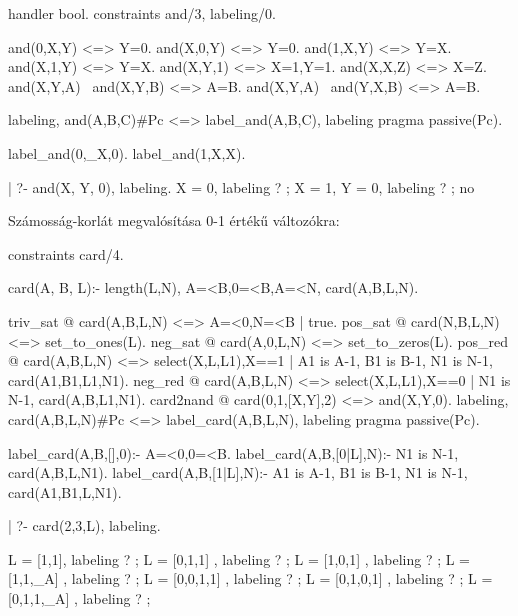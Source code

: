 \begin{prologcode}
handler bool.
constraints and/3, labeling/0. 

and(0,X,Y) <=> Y=0.                      
and(X,0,Y) <=> Y=0.                      
and(1,X,Y) <=> Y=X.                      
and(X,1,Y) <=> Y=X.                      
and(X,Y,1) <=> X=1,Y=1.                  
and(X,X,Z) <=> X=Z.                      
and(X,Y,A) \ and(X,Y,B) <=> A=B.         
and(X,Y,A) \ and(Y,X,B) <=> A=B.         
                                      
labeling, and(A,B,C)#Pc <=> 
        label_and(A,B,C), labeling               
    pragma passive(Pc).        
                               
label_and(0,_X,0).      
label_and(1,X,X).      

| ?- and(X, Y, 0), labeling.   
  X = 0, labeling ? ;          
  X = 1, Y = 0, labeling ? ;
  no
\end{prologcode}

Számosság-korlát megvalósítása 0-1 értékű változókra:

\begin{prologcode}
constraints card/4.

card(A, B, L):-  
        length(L,N), A=<B,0=<B,A=<N, card(A,B,L,N).

triv_sat @ card(A,B,L,N) <=> A=<0,N=<B | true.          
pos_sat @ card(N,B,L,N) <=> set_to_ones(L).             
neg_sat @ card(A,0,L,N) <=> set_to_zeros(L).            
pos_red @ card(A,B,L,N) <=> select(X,L,L1),X==1 |       
                A1 is A-1, B1 is B-1, N1 is N-1, 
                card(A1,B1,L1,N1).
neg_red @ card(A,B,L,N) <=> select(X,L,L1),X==0 | 
                N1 is N-1, card(A,B,L1,N1).
card2nand @ card(0,1,[X,Y],2) <=> and(X,Y,0).           
labeling, card(A,B,L,N)#Pc <=> 
  label_card(A,B,L,N), labeling
    pragma passive(Pc).

label_card(A,B,[],0):- A=<0,0=<B.
label_card(A,B,[0|L],N):- N1 is N-1, card(A,B,L,N1).
label_card(A,B,[1|L],N):- 
    A1 is A-1, B1 is B-1, N1 is N-1, card(A1,B1,L,N1).

| ?- card(2,3,L), labeling.

L = [1,1], labeling ? ;      
L = [0,1,1] , labeling ? ; 
L = [1,0,1] , labeling ? ;   
L = [1,1,_A] , labeling ? ; 
L = [0,0,1,1] , labeling ? ; 
L = [0,1,0,1] , labeling ? ; 
L = [0,1,1,_A] , labeling ? ;  
\end{prologcode}

